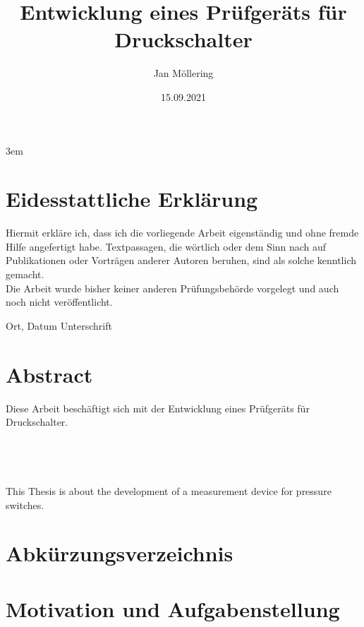 \documentclass[12pt,a4paper,twoside]{report}
\title{Entwicklung eines Prüfgeräts für Druckschalter}
\author{Jan Möllering}
\date{15.09.2021}
\begin{document}
\emergencystretch 3em



\chapter*{Eidesstattliche Erklärung}
\thispagestyle{empty}
Hiermit erkläre ich, dass ich die vorliegende Arbeit eigenständig
und ohne fremde Hilfe angefertigt habe.
Textpassagen, die wörtlich oder dem Sinn nach auf Publikationen
oder Vorträgen anderer Autoren beruhen, sind als solche kenntlich gemacht.
\\
\noindent
Die Arbeit wurde bisher keiner anderen Prüfungsbehörde vorgelegt
und auch noch nicht veröffentlicht.

\vspace{4cm}

\hspace{1cm} Ort, Datum \hfill Unterschrift \hspace{2cm}

\chapter*{Abstract}
\thispagestyle{empty}
Diese Arbeit beschäftigt sich mit der Entwicklung eines Prüfgeräts für Druckschalter.
\\
\\
\\
\\
\\
This Thesis is about the development of a measurement device for pressure switches.

\setcounter{tocdepth}{2}
\tableofcontents
\thispagestyle{empty}
\newpage
{}


\listoftables
\newpage

\listoffigures

\chapter*{Abkürzungsverzeichnis}

\newpage

\chapter{Motivation und Aufgabenstellung}
\setcounter{page}{1}

\end{document}
